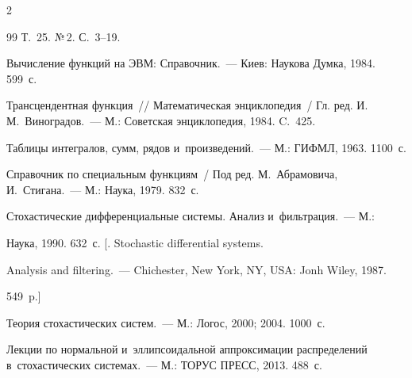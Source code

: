 \begin{multicols}{2}
{{\begin{thebibliography}{99}
Т.~25. №\,2. С.~3--19.





Вычисление функций на ЭВМ: Справочник.~--- Киев: Наукова Думка, 1984. 599~с.





Трансцендентная функция~// Математическая энциклопедия~/ Гл. ред. И.\,М.~Виноградов.~--- М.: Советская энциклопедия, 1984. C.~425.





Таблицы интегралов, сумм, рядов и~произведений.~--- М.: ГИФМЛ, 1963. 1100~с.




Справочник по специальным функциям~/ Под ред. М.~Абрамовича, И.~Стигана.~--- М.: Наука, 1979. 832~с.





Стохастические дифференциальные системы. Анализ и~фильтрация.~--- М.:

Наука,  1990.  632~с. [. Stochastic differential systems.

Analysis and filtering.~--- Chichester, New York, NY, USA: Jonh Wiley, 1987.

549~p.]





Теория стохастических систем.~--- М.: Логос, 2000; 2004. 1000~с.









Лекции по нормальной и~эллипсоидальной аппроксимации распределений в~стохастических системах.~--- М.: ТОРУС ПРЕСС, 2013. 488~с.






\end{thebibliography}}}
\end{multicols}

